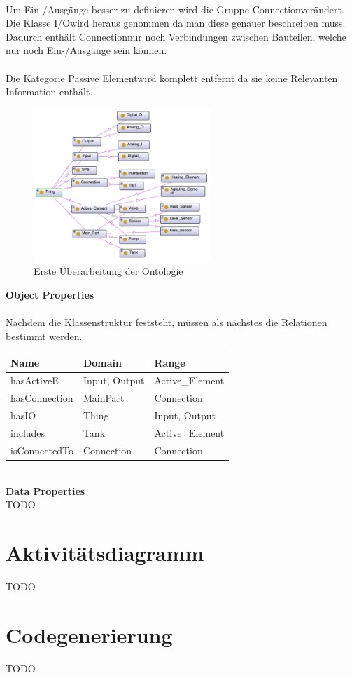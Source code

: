 \\
Um Ein-/Ausgänge besser zu definieren wird die Gruppe \glqq Connection\grqq\space verändert. Die Klasse \glqq I/O\grqq\space wird heraus genommen da man diese genauer beschreiben muss. Dadurch enthält \glqq Connection\grqq\space nur noch Verbindungen zwischen Bauteilen, welche nur noch Ein-/Ausgänge sein können.\\
\\
Die Kategorie \glqq Passive Element\grqq\space wird komplett entfernt da sie keine Relevanten Information enthält.

\begin{figure}[hbt!]
  \centering
  \includegraphics[width=0.6\textwidth]{graphics/implementation/Ontology_v2}
  \caption{Erste Überarbeitung der Ontologie}
\end{figure}

\textbf{Object Properties}\\
\\
Nachdem die Klassenstruktur feststeht, müssen als nächstes die Relationen bestimmt werden.
\begin{table}[h]
\centering
\begin{tabular}{l|l|l}
\textbf{Name} & \textbf{Domain} & \textbf{Range} \\ \hline
hasActiveE    & Input, Output   & Active\_Element \\ \hline
hasConnection & MainPart        & Connection      \\ \hline
hasIO         & Thing           & Input, Output   \\ \hline
includes      & Tank            & Active\_Element \\ \hline
isConnectedTo & Connection      & Connection                            
\end{tabular}
\end{table}
\\
\textbf{Data Properties}\\
TODO
\section{Aktivitätsdiagramm}
TODO
\section{Codegenerierung}

TODO